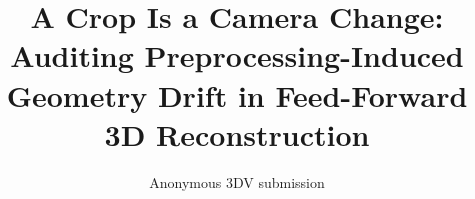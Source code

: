 \documentclass[10pt,twocolumn,letterpaper]{article}
\title{A Crop Is a Camera Change: Auditing Preprocessing-Induced\\
Geometry Drift in Feed-Forward 3D Reconstruction}
\author{Anonymous 3DV submission}
\begin{document}
\maketitle









{
  \small
  
  
}
\end{document}

